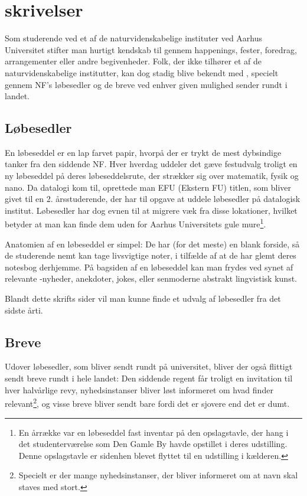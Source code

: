 \chapter{\TKETs skrivelser}
Som studerende ved et af de naturvidenskabelige instituter ved Aarhus Universitet stifter man hurtigt kendskab til \TKET gennem happenings, fester, foredrag, arrangementer eller andre begivenheder. Folk, der ikke tilhører et af de naturvidenskabelige institutter, kan dog stadig blive bekendt med \TKET, specielt gennem NF's løbesedler og de breve \TKET ved enhver given mulighed sender rundt i landet.

\section{Løbesedler}

En løbeseddel er en lap farvet papir, hvorpå der er trykt de mest dybsindige tanker fra den siddende NF. Hver hverdag uddeler det gæve festudvalg troligt en ny løbeseddel på deres løbeseddelsrute, der strækker sig over matematik, fysik og nano. Da datalogi kom til, oprettede man EFU (Ekstern FU) titlen, som bliver givet til en 2. årsstuderende, der har til opgave at uddele løbesedler på datalogisk institut. Løbesedler har dog evnen til at migrere væk fra disse lokationer, hvilket betyder at man kan finde dem uden for Aarhus Universitets gule mure\footnote{En årrække var en løbeseddel fast inventar på den opslagstavle, der hang i det studenterværelse som Den Gamle By havde opstillet i deres udstilling. Denne opslagstavle er sidenhen blevet flyttet til en udstilling i kælderen.}.

Anatomien af en løbeseddel er simpel: De har (for det meste) en blank forside, så de studerende nemt kan tage livsvigtige noter, i tilfælde af at de har glemt deres notesbog derhjemme. På bagsiden af en løbeseddel kan man frydes ved synet af relevante \TK{}-nyheder, anekdoter, jokes, eller senmoderne abstrakt lingvistisk kunst.

Blandt dette skrifts sider vil man kunne finde et udvalg af løbesedler fra det sidste årti.

\section{Breve}
Udover løbesedler, som bliver sendt rundt på universitet, bliver der også flittigt sendt breve rundt i hele landet: Den siddende regent får troligt en invitation til hver halvårlige revy, nyhedsinstanser bliver løst informeret om hvad \TKET finder relevant\footnote{Specielt er der mange nyhedsinstanser, der bliver informeret om at \TKETs navn skal staves med stort.}, og visse breve bliver sendt bare fordi det er sjovere end det er dumt.

